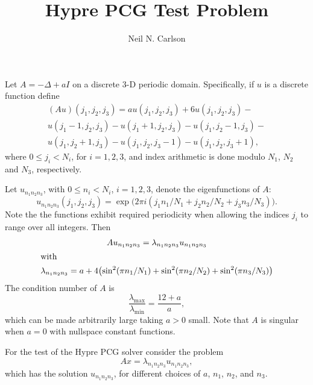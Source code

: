 \documentclass[12pt,reqno]{amsart}
\title{Hypre PCG Test Problem}
\author{Neil N. Carlson}
\begin{document}
\maketitle

Let $A = -\Delta + a I$ on a discrete 3-D periodic domain.  Specifically,
if $u$ is a discrete function define
\begin{multline}
  (Au)(j_1,j_2,j_3) = a u(j_1,j_2,j_3) + 6 u(j_1,j_2,j_3) - {} \\
      u(j_1-1,j_2,j_3) - u(j_1+1,j_2,j_3) - u(j_1,j_2-1,j_3) - {} \\
      u(j_1,j_2+1,j_3) - u(j_1,j_2,j_3-1) - u(j_1,j_2,j_3+1),
\end{multline}
where $0 \le j_i < N_i$, for $i=1,2,3$, and index arithmetic is
done modulo $N_1$, $N_2$ and $N_3$, respectively.

Let $u_{n_1n_2n_3}$, with $0 \le n_i < N_i$, $i=1,2,3$, denote the
eigenfunctions of $A$:
\begin{equation}
  u_{n_1n_2n_3}(j_1,j_2,j_3) =
    \exp\bigl(2\pi i(j_1 n_1/N_1 + j_2 n_2/N_2 + j_3 n_3/N_3)\bigr).
\end {equation}
Note the the functions exhibit required periodicity when allowing the
indices $j_i$ to range over all integers.  Then
\begin{gather}
  Au_{n_1n_2n_3} = \lambda_{n_1n_2n_3} u_{n_1n_2n_3} \\ \intertext{with}
  \lambda_{n_1n_2n_3} = a + 4\bigl(\sin^2(\pi n_1/N_1) +
                        \sin^2(\pi n_2/N_2) + \sin^2(\pi n_3/N_3)\bigr)
\end{gather}
The condition number of $A$ is 
\begin{equation}
  \frac{\lambda_{\text{max}}}{\lambda_{\text{min}}} = \frac{12+a}{a},
\end{equation}
which can be made arbitrarily large taking $a>0$ small.  Note that
$A$ is singular when $a=0$ with nullspace constant functions.

For the test of the Hypre PCG solver consider the problem
\begin{equation}
  A x = \lambda_ {n_1n_2n_3} u_{n_1n_2n_3},
\end{equation}
which has the solution $u_{n_1n_2n_3}$, for different choices of $a$,
$n_1$, $n_2$, and $n_3$.
\end{document}
